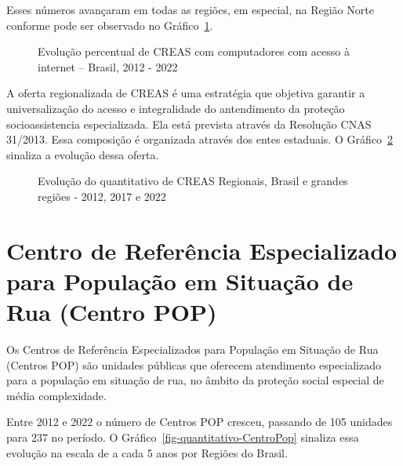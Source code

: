 \documentclass[
  letterpaper,
  DIV=11,
  numbers=noendperiod]{scrreprt}
\begin{document}
Esses números avançaram em todas as regiões, em especial, na Região
Norte conforme pode ser observado no
Gráfico~\ref{fig-CREAS-internet-percentual}.

\begin{figure}


\caption{\label{fig-CREAS-internet-percentual}Evolução percentual de
CREAS com computadores com acesso à internet -- Brasil, 2012 - 2022}

\end{figure}%

A oferta regionalizada de CREAS é uma estratégia que objetiva garantir a
universalização do acesso e integralidade do antendimento da proteção
socioassistencia especializada. Ela está prevista através da Resolução
CNAS 31/2013. Essa composição é organizada através dos entes estaduais.
O Gráfico~\ref{fig-creas-regionais} sinaliza a evolução dessa oferta.

\begin{figure}


\caption{\label{fig-creas-regionais}Evolução do quantitativo de CREAS
Regionais, Brasil e grandes regiões - 2012, 2017 e 2022}

\end{figure}%

\section{Centro de Referência Especializado para População em Situação
de Rua (Centro
POP)}\label{centro-de-referuxeancia-especializado-para-populauxe7uxe3o-em-situauxe7uxe3o-de-rua-centro-pop}

Os Centros de Referência Especializados para População em Situação de
Rua (Centros POP) são unidades públicas que oferecem atendimento
especializado para a população em situação de rua, no âmbito da proteção
social especial de média complexidade.

Entre 2012 e 2022 o número de Centros POP cresceu, passando de 105
unidades para 237 no período. O Gráfico~\ref{fig-quantitativo-CentroPop}
sinaliza essa evolução na escala de a cada 5 anos por Regiões do Brasil.
\end{document}
